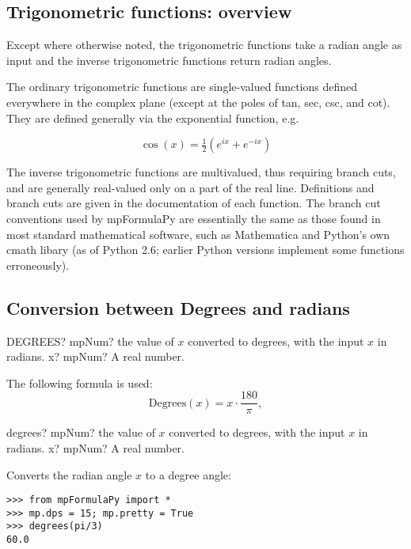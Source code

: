 \subsection{Trigonometric functions: overview}
Except where otherwise noted, the trigonometric functions take a radian angle as input and the inverse trigonometric functions return radian angles.

\vpara
The ordinary trigonometric functions are single-valued functions defined everywhere in the complex plane (except at the poles of tan, sec, csc, and cot). They are defined generally via the exponential function, e.g.

\begin{equation}
	\cos(x)=\tfrac{1}{2}(e^{ix} + e^{-ix})
\end{equation}

The inverse trigonometric functions are multivalued, thus requiring branch cuts, and are generally real-valued only on a part of the real line. Definitions and branch cuts are given in the documentation of each function. The branch cut conventions used by mpFormulaPy are essentially the same as those found in most standard mathematical software, such as
Mathematica and Python’s own cmath libary (as of Python 2.6; earlier Python versions implement some functions erroneously).




\subsection{Conversion between Degrees and radians}

\begin{mpFunctionsExtract}
	\mpWorksheetFunctionOneNotImplemented
	{DEGREES? mpNum? the value of $x$ converted to degrees, with the input $x$ in radians.}
	{x? mpNum? A real number.}
\end{mpFunctionsExtract}
The following formula is used:
\begin{equation}
	\text{Degrees}(x) = x \cdot \frac{180}{\pi},
\end{equation}


\begin{mpFunctionsExtract}
	\mpFunctionOne
	{degrees? mpNum? the value of $x$ converted to degrees, with the input $x$ in radians.}
	{x? mpNum? A real number.}
\end{mpFunctionsExtract}

Converts the radian angle $x$ to a degree angle:
\begin{lstlisting}
>>> from mpFormulaPy import *
>>> mp.dps = 15; mp.pretty = True
>>> degrees(pi/3)
60.0
\end{lstlisting}



